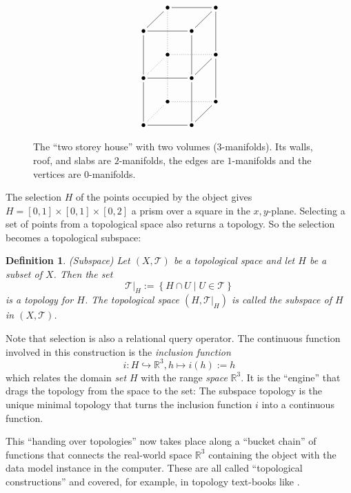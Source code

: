 \documentclass[5p]{elsarticle}
\newtheorem{dfn}{Definition}
\newcommand{\mathpset}[2]{\left\{#1\mid #2\right\}}
\newcommand{\qq}[1]{``#1''}
\begin{document}
\begin{figure}[b]
$$\xymatrix@=16pt@M=2pt{
  & \bullet \ar@{-}[rr]& & \bullet\\
\bullet\ar@{-}[rr]\ar@{-}[ru]& & \bullet\ar@{-}[ru]\\
  & \bullet \ar@{.}[rr]\ar@{.}[uu]& & \bullet\ar@{-}[uu]\\
\bullet\ar@{-}[rr]\ar@{-}[uu]\ar@{.}[ru]& & \bullet\ar@{-}[ru]\ar@{-}[uu]\\
  & \bullet \ar@{.}[rr]\ar@{.}[uu]& & \bullet\ar@{-}[uu]\\
\bullet\ar@{-}[rr]\ar@{-}[uu]\ar@{.}[ru]& & \bullet\ar@{-}[ru]\ar@{-}[uu]\\
}$$
\caption{The \qq{two storey house} with two volumes ($3$-manifolds). Its walls, roof, and slabs 
are $2$-manifolds, the edges are $1$-manifolds and the vertices are $0$-manifolds.} 
\label{fig:house}
\end{figure}

The selection $H$ of the points occupied by the object gives   
$H = [0,1]\times[0,1]\times[0,2]$ a prism over a square in the 
$x,y$-plane. Selecting a set of points from a topological space also returns a 
topology. So the selection becomes a topological subspace: 
\begin{dfn}(Subspace)
Let $(X,\mathcal{T})$ be a topological space and let $H$ be a subset of $X$. 
Then the set 
$$\mathcal{T}|_H := \mathpset{H \cap U}{U \in \mathcal{T}}$$ is a topology for $H$. 
The topological space $(H,\mathcal{T}|_H)$ is called the \emph{subspace} of $H$ 
in $(X,\mathcal{T})$. 
\end{dfn}
Note that selection is also a relational query operator. 
The continuous function involved in this construction is 
the \emph{inclusion function} 
$$
   i:H\hookrightarrow \mathbb{R}^3, h \mapsto i(h) := h
$$
which relates the domain \emph{set} $H$ with the range \emph{space} 
$\mathbb{R}^3$. 
It is the \qq{engine} that drags the topology from the space to the set: 
The subspace topology is the unique minimal topology that turns the inclusion 
function $i$ into a continuous function. 

\begin{sloppy} This \qq{handing over topologies} now takes place along a \qq{bucket chain} of functions that connects 
the real-world space $\mathbb{R}^3$ containing the object with the data model instance in the 
computer. These are all called \qq{topological constructions} and covered, for example, in topology 
text-books like \cite[Ch.\ IV]{Viro:Textbook}. 
\end{sloppy} 
\end{document}
